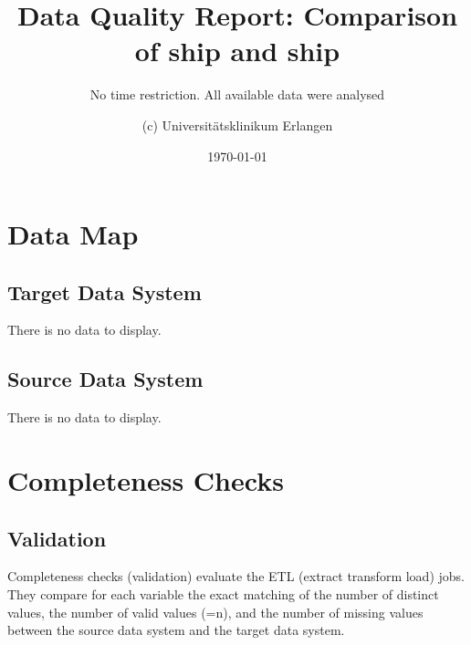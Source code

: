 \documentclass[
]{article}
\title{Data Quality Report: Comparison of ship and ship}
\subtitle{No time restriction. All available data were analysed}
\author{(c) Universitätsklinikum Erlangen}
\date{\today}
\begin{document}
\maketitle

{
\setcounter{tocdepth}{2}
\tableofcontents
}
\newpage

\hypertarget{data-map}{%
\section{Data Map}\label{data-map}}

\hypertarget{target-data-system}{%
\subsection{Target Data System}\label{target-data-system}}

There is no data to display.

\hypertarget{source-data-system}{%
\subsection{Source Data System}\label{source-data-system}}

There is no data to display.

\newpage

\hypertarget{completeness-checks}{%
\section{Completeness Checks}\label{completeness-checks}}

\hypertarget{validation}{%
\subsection{Validation}\label{validation}}

Completeness checks (validation) evaluate the ETL (extract transform
load) jobs. They compare for each variable the exact matching of the
number of distinct values, the number of valid values (=n), and the
number of missing values between the source data system and the target
data system.
\end{document}
